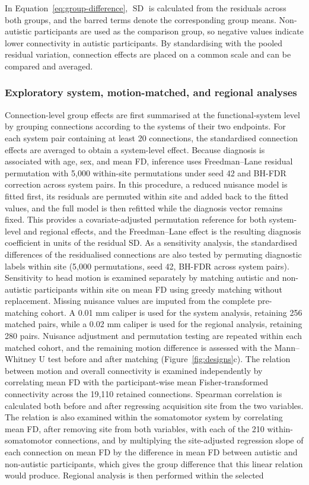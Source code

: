 In Equation~\eqref{eq:group-difference}, $\operatorname{SD}$ is calculated from the residuals across both groups, and the barred terms denote the corresponding group means. Non-autistic participants are used as the comparison group, so negative values indicate lower connectivity in autistic participants. By standardising with the pooled residual variation, connection effects are placed on a common scale and can be compared and averaged.


\subsubsection{Exploratory system, motion-matched, and regional analyses}
\label{subsubsec:system-motion-regional}

Connection-level group effects are first summarised at the functional-system level by grouping connections according to the systems of their two endpoints. For each system pair containing at least 20 connections, the standardised connection effects are averaged to obtain a system-level effect. Because diagnosis is associated with age, sex, and mean FD, inference uses Freedman--Lane residual permutation with 5,000 within-site permutations under seed 42 and BH-FDR correction across system pairs. In this procedure, a reduced nuisance model is fitted first, its residuals are permuted within site and added back to the fitted values, and the full model is then refitted while the diagnosis vector remains fixed. This provides a covariate-adjusted permutation reference for both system-level and regional effects, and the Freedman--Lane effect is the resulting diagnosis coefficient in units of the residual SD. As a sensitivity analysis, the standardised differences of the residualised connections are also tested by permuting diagnostic labels within site (5,000 permutations, seed 42, BH-FDR across system pairs). Sensitivity to head motion is examined separately by matching autistic and non-autistic participants within site on mean FD using greedy matching without replacement. Missing nuisance values are imputed from the complete pre-matching cohort. A 0.01 mm caliper is used for the system analysis, retaining 256 matched pairs, while a 0.02 mm caliper is used for the regional analysis, retaining 280 pairs. Nuisance adjustment and permutation testing are repeated within each matched cohort, and the remaining motion difference is assessed with the Mann--Whitney U test before and after matching (Figure~\ref{fig:designs}c). The relation between motion and overall connectivity is examined independently by correlating mean FD with the participant-wise mean Fisher-transformed connectivity across the 19,110 retained connections. Spearman correlation is calculated both before and after regressing acquisition site from the two variables. The relation is also examined within the somatomotor system by correlating mean FD, after removing site from both variables, with each of the 210 within-somatomotor connections, and by multiplying the site-adjusted regression slope of each connection on mean FD by the difference in mean FD between autistic and non-autistic participants, which gives the group difference that this linear relation would produce. Regional analysis is then performed within the selected 